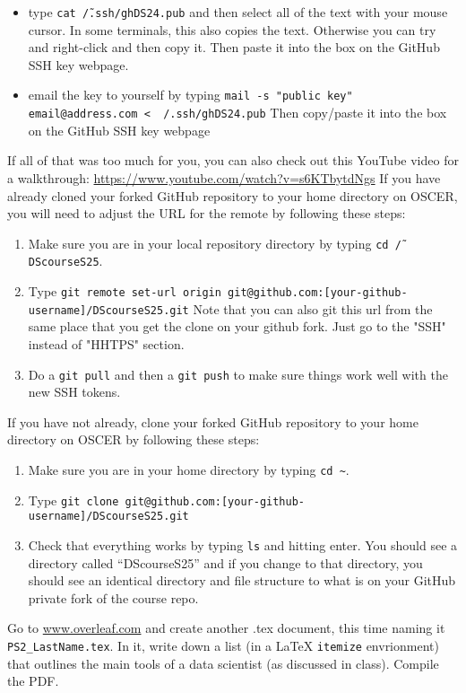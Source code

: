 \documentclass[12pt,english]{exam}
\begin{document}
\begin{questions}
\begin{enumerate}
\begin{itemize}
        \item type \texttt{cat \~/.ssh/ghDS24.pub} and then select all of the text with your mouse cursor. In some terminals, this also copies the text. Otherwise you can try and right-click and then copy it. Then paste it into the box on the GitHub SSH key webpage.
        \item email the key to yourself by typing
        \texttt{mail -s "public key" email@address.com < ~/.ssh/ghDS24.pub}
        Then copy/paste it into the box on the GitHub SSH key webpage
    \end{itemize}
\end{enumerate}
    If all of that was too much for you, you can also check out this YouTube video for a walkthrough: \url{https://www.youtube.com/watch?v=s6KTbytdNgs}
\question If you have already cloned your forked GitHub repository to your home directory on OSCER, you will need to adjust the URL for the remote by following these steps:
\begin{enumerate}
    \item Make sure you are in your local repository directory by typing \texttt{cd \~/DScourseS25}.
    \item Type 
        \texttt{git remote set-url origin git@github.com:[your-github-username]/DScourseS25.git}
        Note that you can also git this url from the same place that you get the clone on your github fork. Just go to the "SSH" instead of "HHTPS" section.
    \item Do a \texttt{git pull} and then a \texttt{git push} to make sure things work well with the new SSH tokens.
\end{enumerate}
\question If you have not already, clone your forked GitHub repository to your home directory on OSCER by following these steps:
\begin{enumerate}
    \item Make sure you are in your home directory by typing \texttt{cd \~}.
    \item Type \texttt{git clone git@github.com:[your-github-username]/DScourseS25.git}
    \item Check that everything works by typing \texttt{ls} and hitting enter. You should see a directory called ``DScourseS25'' and if you change to that directory, you should see an identical directory and file structure to what is on your GitHub private fork of the course repo.
\end{enumerate}
\question Go to \url{www.overleaf.com} and create another .tex document, this time naming it \texttt{PS2\_LastName.tex}. In it, write down a list (in a LaTeX \texttt{itemize} envrionment) that outlines the main tools of a data scientist (as discussed in class). Compile the PDF.

\end{questions}
\end{document}
